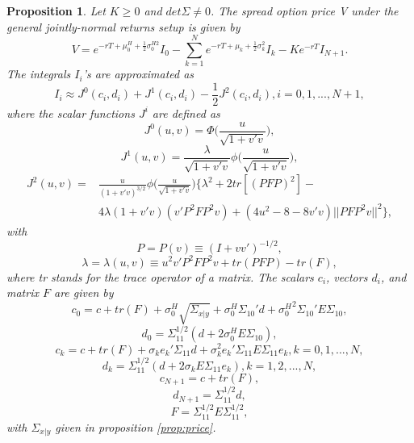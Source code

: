 \documentclass[a4paper]{article}
\newtheorem{prop}{Proposition}
\begin{document}
\begin{prop}
\label{prop:approx2}
Let $K\geq0$ and $det \Sigma \neq 0$. The spread option price V under the general jointly-normal returns setup is given by
\begin{equation}
\label{eq:cf2}
V=e^{-rT+\mu_0^H+\frac{1}{2}\sigma_0^{H2}}I_0-\sum_{k=1}^Ne^{-rT+\mu_k+\frac{1}{2}\sigma_k^2}I_k-Ke^{-rT}I_{N+1}.
\end{equation}
The integrals $I_i$'s are approximated as
$$I_i\approx J^0(c_i,d_i)+J^1(c_i,d_i)-\frac{1}{2}J^2(c_i,d_i), i=0,1,...,N+1,$$
where the scalar functions $J^i$ are defined as
\begin{equation}
\label{eq:j0}
J^0(u,v)=\Phi\Big(\frac{u}{\sqrt{1+v'v}}\Big),
\end{equation}
\begin{equation}
\label{eq:j1}
J^1(u,v)=\frac{\lambda}{\sqrt{1+v'v}}\phi\Big(\frac{u}{\sqrt{1+v'v}}\Big),
\end{equation}
\begin{equation}
\label{eq:j2}
\begin{split}
J^2(u,v)=&\frac{u}{(1+v'v)^{3/2}}\phi\Big(\frac{u}{\sqrt{1+v'v}}\Big)\Big\{\lambda^2+2tr[(PFP)^2]- \\
	&4\lambda(1+v'v)(v'P^2FP^2v)+(4u^2-8-8v'v)||PFP^2v||^2\Big\},
\end{split}
\end{equation}
with
\begin{equation}
\label{eq:p}
P=P(v)\equiv(I+vv')^{-1/2},
\end{equation}
\begin{equation}
\lambda=\lambda(u,v)\equiv u^2v'P^2FP^2v+tr(PFP)-tr(F),
\end{equation}
where tr stands for the trace operator of a matrix. The scalars $c_i$, vectors $d_i$, and matrix $F$ are given by
\begin{equation}
c_0=c+tr(F)+\sigma_0^H\sqrt{\Sigma_{x|y}}+\sigma_0^H\Sigma_{10}'d+{\sigma_0^H}^2\Sigma_{10}'E\Sigma_{10},
\end{equation}
\begin{equation}
\label{eq:d0}
d_0=\Sigma_{11}^{1/2}(d+2\sigma_0^HE\Sigma_{10}),
\end{equation}
\begin{equation}
c_k=c+tr(F)+\sigma_ke_k'\Sigma_{11}d+\sigma_k^2e_k'\Sigma_{11}E\Sigma_{11}e_k,k=0,1,...,N,
\end{equation}
\begin{equation}
\label{eq:dk}
d_k=\Sigma_{11}^{1/2}(d+2\sigma_kE\Sigma_{11}e_k),k=1,2,...,N,
\end{equation}
\begin{equation}
c_{N+1}=c+tr(F),
\end{equation}
\begin{equation}
\label{eq:dN1}
d_{N+1}=\Sigma_{11}^{1/2}d,
\end{equation}
\begin{equation}
F=\Sigma_{11}^{1/2}E\Sigma_{11}^{1/2},
\end{equation}
with $\Sigma_{x|y}$ given in proposition \ref{prop:price}.
\end{prop}
\end{document}
